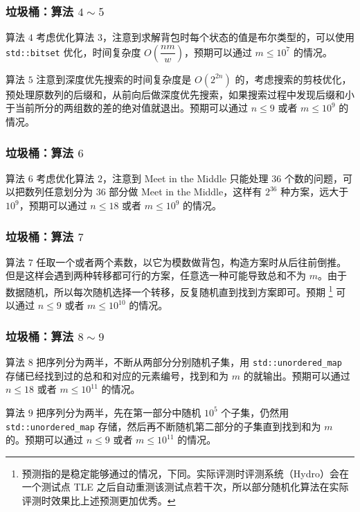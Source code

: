 \documentclass{beamer}
\begin{document}
\begin{frame}
\frametitle{垃圾桶：算法 $4 \sim 5$}
\begin{block}{算法 $4$}
考虑优化算法 $3$，注意到求解背包时每个状态的值是布尔类型的，可以使用 \texttt{std::bitset} 优化，时间复杂度 $O\left( \dfrac{nm}{w} \right)$，预期可以通过 $m \leq 10^7$ 的情况。
\end{block}
\pause
\begin{block}{算法 $5$}
注意到深度优先搜索的时间复杂度是 $O(2^{2n})$ 的，考虑搜索的剪枝优化，预处理原数列的后缀和，从前向后做深度优先搜索，如果搜索过程中发现后缀和小于当前所分的两组数的差的绝对值就退出。预期可以通过 $n \leq 9$ 或者 $m \leq 10^9$ 的情况。
\end{block}
\end{frame}

\begin{frame}
\frametitle{垃圾桶：算法 $6$}
\begin{block}{算法 $6$}
考虑优化算法 $2$，注意到 Meet in the Middle 只能处理 $36$ 个数的问题，可以把数列任意划分为 $36$ 部分做 Meet in the Middle，这样有 $2^{36}$ 种方案，远大于 $10^9$，预期可以通过 $n \leq 18$ 或者 $m \leq 10^9$ 的情况。
\end{block}
\end{frame}

\begin{frame}
\frametitle{垃圾桶：算法 $7$}
\begin{block}{算法 $7$}
任取一个或者两个素数，以它为模数做背包，构造方案时从后往前倒推。但是这样会遇到两种转移都可行的方案，任意选一种可能导致总和不为 $m$。由于数据随机，所以每次随机选择一个转移，反复随机直到找到方案即可。预期 \footnote{预测指的是稳定能够通过的情况，下同。实际评测时评测系统（Hydro）会在一个测试点 TLE 之后自动重测该测试点若干次，所以部分随机化算法在实际评测时效果比上述预测更加优秀。} 可以通过 $n \leq 9$ 或者 $m \leq 10^{10}$ 的情况。
\end{block}
\end{frame}

\begin{frame}
\frametitle{垃圾桶：算法 $8 \sim 9$}
\begin{block}{算法 $8$}
把序列分为两半，不断从两部分分别随机子集，用 \texttt{std::unordered\_map} 存储已经找到过的总和和对应的元素编号，找到和为 $m$ 的就输出。预期可以通过 $n \leq 18$ 或者 $m \leq 10^{11}$ 的情况。
\end{block}
\pause
\begin{block}{算法 $9$}
把序列分为两半，先在第一部分中随机 $10^5$ 个子集，仍然用 \texttt{std::unordered\_map} 存储，然后再不断随机第二部分的子集直到找到和为 $m$ 的。预期可以通过 $n \leq 9$ 或者 $m \leq 10^{11}$ 的情况。
\end{block}
\end{frame}
\end{document}
